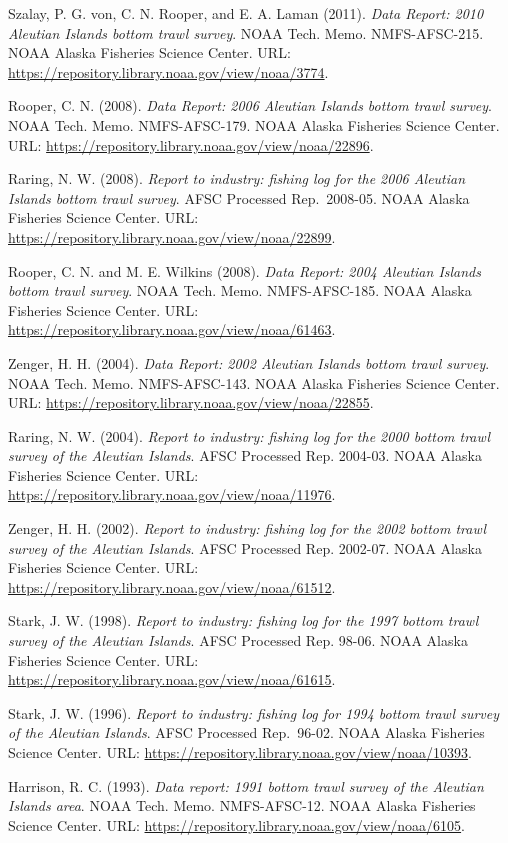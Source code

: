 \documentclass[
  letterpaper,
  oneside,
  open=any]{scrbook}
\begin{document}
Szalay, P. G. von, C. N. Rooper, and E. A. Laman (2011). \emph{Data
Report: 2010 Aleutian Islands bottom trawl survey}. NOAA Tech. Memo.
NMFS-AFSC-215. NOAA Alaska Fisheries Science Center. URL:
\url{https://repository.library.noaa.gov/view/noaa/3774}.

Rooper, C. N. (2008). \emph{Data Report: 2006 Aleutian Islands bottom
trawl survey}. NOAA Tech. Memo. NMFS-AFSC-179. NOAA Alaska Fisheries
Science Center. URL:
\url{https://repository.library.noaa.gov/view/noaa/22896}.

Raring, N. W. (2008). \emph{Report to industry: fishing log for the 2006
Aleutian Islands bottom trawl survey}. AFSC Processed Rep.~2008-05. NOAA
Alaska Fisheries Science Center. URL:
\url{https://repository.library.noaa.gov/view/noaa/22899}.

Rooper, C. N. and M. E. Wilkins (2008). \emph{Data Report: 2004 Aleutian
Islands bottom trawl survey}. NOAA Tech. Memo. NMFS-AFSC-185. NOAA
Alaska Fisheries Science Center. URL:
\url{https://repository.library.noaa.gov/view/noaa/61463}.

Zenger, H. H. (2004). \emph{Data Report: 2002 Aleutian Islands bottom
trawl survey}. NOAA Tech. Memo. NMFS-AFSC-143. NOAA Alaska Fisheries
Science Center. URL:
\url{https://repository.library.noaa.gov/view/noaa/22855}.

Raring, N. W. (2004). \emph{Report to industry: fishing log for the 2000
bottom trawl survey of the Aleutian Islands}. AFSC Processed Rep.
2004-03. NOAA Alaska Fisheries Science Center. URL:
\url{https://repository.library.noaa.gov/view/noaa/11976}.

Zenger, H. H. (2002). \emph{Report to industry: fishing log for the 2002
bottom trawl survey of the Aleutian Islands}. AFSC Processed Rep.
2002-07. NOAA Alaska Fisheries Science Center. URL:
\url{https://repository.library.noaa.gov/view/noaa/61512}.

Stark, J. W. (1998). \emph{Report to industry: fishing log for the 1997
bottom trawl survey of the Aleutian Islands}. AFSC Processed Rep. 98-06.
NOAA Alaska Fisheries Science Center. URL:
\url{https://repository.library.noaa.gov/view/noaa/61615}.

Stark, J. W. (1996). \emph{Report to industry: fishing log for 1994
bottom trawl survey of the Aleutian Islands}. AFSC Processed Rep.~96-02.
NOAA Alaska Fisheries Science Center. URL:
\url{https://repository.library.noaa.gov/view/noaa/10393}.

Harrison, R. C. (1993). \emph{Data report: 1991 bottom trawl survey of
the Aleutian Islands area}. NOAA Tech. Memo. NMFS-AFSC-12. NOAA Alaska
Fisheries Science Center. URL:
\url{https://repository.library.noaa.gov/view/noaa/6105}.
\end{document}
